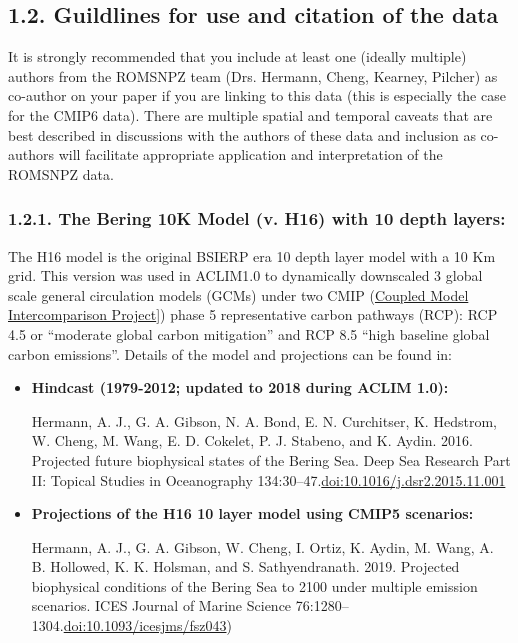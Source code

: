 \documentclass[
]{article}
\begin{document}
\hypertarget{guildlines-for-use-and-citation-of-the-data}{%
\subsection{1.2. Guildlines for use and citation of the
data}\label{guildlines-for-use-and-citation-of-the-data}}

It is strongly recommended that you include at least one (ideally
multiple) authors from the ROMSNPZ team (Drs. Hermann, Cheng, Kearney,
Pilcher) as co-author on your paper if you are linking to this data
(this is especially the case for the CMIP6 data). There are multiple
spatial and temporal caveats that are best described in discussions with
the authors of these data and inclusion as co-authors will facilitate
appropriate application and interpretation of the ROMSNPZ data.

\hypertarget{the-bering-10k-model-v.-h16-with-10-depth-layers}{%
\subsubsection{1.2.1. The Bering 10K Model (v. H16) with 10 depth
layers:}\label{the-bering-10k-model-v.-h16-with-10-depth-layers}}

The H16 model is the original BSIERP era 10 depth layer model with a 10
Km grid. This version was used in ACLIM1.0 to dynamically downscaled 3
global scale general circulation models (GCMs) under two CMIP
(\href{https://www.wcrp-climate.org/wgcm-cmip}{Coupled Model
Intercomparison Project}{]}) phase 5 representative carbon pathways
(RCP): RCP 4.5 or ``moderate global carbon mitigation'' and RCP 8.5
``high baseline global carbon emissions''. Details of the model and
projections can be found in:

\begin{itemize}
\item
  \textbf{Hindcast (1979-2012; updated to 2018 during ACLIM 1.0):}

  Hermann, A. J., G. A. Gibson, N. A. Bond, E. N. Curchitser, K.
  Hedstrom, W. Cheng, M. Wang, E. D. Cokelet, P. J. Stabeno, and K.
  Aydin. 2016. Projected future biophysical states of the Bering Sea.
  Deep Sea Research Part II: Topical Studies in Oceanography
  134:30--47.\href{http://dx.doi.org/10.1016/j.dsr2.2015.11.001}{doi:10.1016/j.dsr2.2015.11.001}
\item
  \textbf{Projections of the H16 10 layer model using CMIP5 scenarios:}

  Hermann, A. J., G. A. Gibson, W. Cheng, I. Ortiz, K. Aydin, M. Wang,
  A. B. Hollowed, K. K. Holsman, and S. Sathyendranath. 2019. Projected
  biophysical conditions of the Bering Sea to 2100 under multiple
  emission scenarios. ICES Journal of Marine Science
  76:1280--1304.\href{https://academic.oup.com/icesjms/article/76/5/1280/5477847?login=true}{doi:10.1093/icesjms/fsz043})
\end{itemize}
\end{document}
